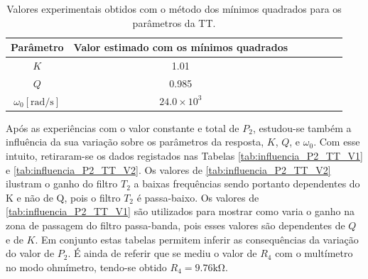 \begin{table}[ht]
    \centering
    \caption{Valores experimentais obtidos com o método dos mínimos quadrados para os parâmetros da TT.}
    \begin{tabular}{ccccccc}
    \hline
    Parâmetro & Valor estimado com os mínimos quadrados \\
    \hline  
    $K$ & 1.01 \\
    $Q$ & 0.985 \\
    $\omega_0 [\si{\radian\per\second}]$ & $24.0\times10^3$ \\
    \hline
    \end{tabular}
    \label{tab:estimativas_LSQ_TT}
\end{table}

Após as experiências com o valor constante e total de $P_2$, estudou-se também a influência da sua variação sobre os parâmetros da resposta, $K$, $Q$, e $\omega_0$. Com esse intuito, retiraram-se os dados registados nas Tabelas \ref{tab:influencia_P2_TT_V1} e \ref{tab:influencia_P2_TT_V2}. Os valores de \ref{tab:influencia_P2_TT_V2} ilustram o ganho do filtro $T_2$ a baixas frequências sendo portanto dependentes do K e não de Q, pois o filtro $T_2$ é passa-baixo. Os valores de \ref{tab:influencia_P2_TT_V1} são utilizados para mostrar como varia o ganho na zona de passagem do filtro passa-banda, pois esses valores são dependentes de $Q$ e de $K$. Em conjunto estas tabelas permitem inferir as consequências da variação do valor de $P_2$. É ainda de referir que se mediu o valor de $R_4$ com o multímetro no modo ohmímetro, tendo-se obtido $R_4 = 9.76 \si{\kilo \ohm}$.

